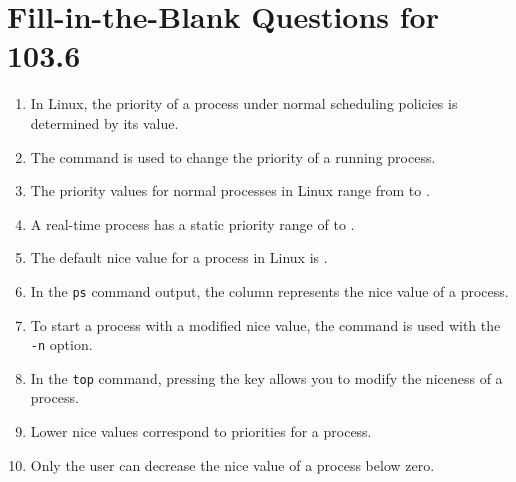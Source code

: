 \documentclass[a4paper]{report}
\begin{document}
\section*{Fill-in-the-Blank Questions for 103.6}

\begin{enumerate}[1.]
    \item In Linux, the priority of a process under normal scheduling policies is determined by its \underline{\hspace{2cm}} value.
    
    \item The \underline{\hspace{2cm}} command is used to change the priority of a running process.
    
    \item The priority values for normal processes in Linux range from \underline{\hspace{2cm}} to \underline{\hspace{2cm}}.
    
    \item A real-time process has a static priority range of \underline{\hspace{2cm}} to \underline{\hspace{2cm}}.
    
    \item The default nice value for a process in Linux is \underline{\hspace{2cm}}.
    
    \item In the \texttt{ps} command output, the \underline{\hspace{2cm}} column represents the nice value of a process.
    
    \item To start a process with a modified nice value, the \underline{\hspace{2cm}} command is used with the \texttt{-n} option.
    
    \item In the \texttt{top} command, pressing the \underline{\hspace{2cm}} key allows you to modify the niceness of a process.
    
    \item Lower nice values correspond to \underline{\hspace{2cm}} priorities for a process.
    
    \item Only the \underline{\hspace{2cm}} user can decrease the nice value of a process below zero.
    \end{enumerate}
\end{document}
